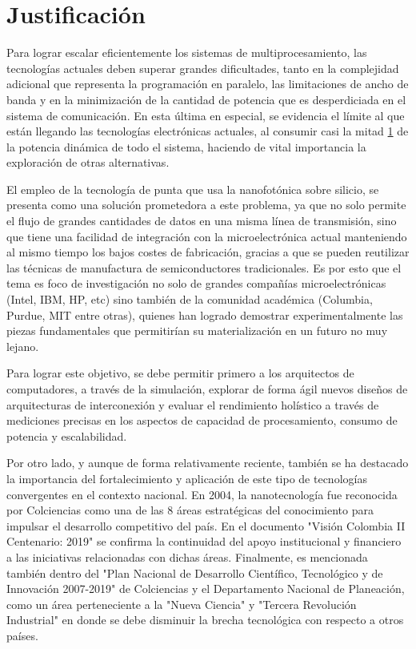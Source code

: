 \section{Justificación}
Para lograr escalar eficientemente los sistemas de multiprocesamiento, las tecnologías 
actuales deben superar grandes dificultades, tanto en la complejidad adicional 
que representa la programación en paralelo, las limitaciones de ancho de banda y en la
minimización de la cantidad de potencia que es desperdiciada en el sistema de comunicación. 
En esta última en especial, se evidencia el límite al que están llegando las 
tecnologías electrónicas actuales, al consumir casi la mitad \ref{} de la potencia dinámica
de todo el sistema, haciendo de vital importancia la exploración de otras alternativas.

El empleo de la tecnología de punta que usa la nanofotónica sobre silicio, 
se presenta como una solución prometedora a este
problema, ya que no solo permite el flujo de grandes cantidades de 
datos en una misma línea de transmisión, sino que tiene una facilidad de 
integración con la microelectrónica actual manteniendo al mismo tiempo los 
bajos costes de fabricación, gracias a que se pueden reutilizar las técnicas 
de manufactura de semiconductores tradicionales. Es por esto que el tema es foco de
investigación no solo de grandes compañías microelectrónicas (Intel, IBM, HP, etc) 
sino también de la comunidad académica (Columbia, Purdue, MIT entre otras), 
quienes han logrado demostrar experimentalmente las piezas fundamentales que 
permitirían su materialización en un futuro no muy lejano.

Para lograr este objetivo, se debe permitir primero a los arquitectos de computadores, 
a través de la simulación, explorar de forma ágil nuevos diseños de arquitecturas 
de interconexión y evaluar el rendimiento holístico a través de mediciones 
precisas en los aspectos de capacidad de procesamiento, consumo de potencia y escalabilidad.

Por otro lado, y aunque de forma relativamente reciente, también se ha destacado 
la importancia del fortalecimiento y aplicación de este tipo de tecnologías convergentes 
en el contexto nacional. En 2004, la nanotecnología fue reconocida por Colciencias como
una de las 8 áreas estratégicas del conocimiento para impulsar el desarrollo 
competitivo del país. En el documento "Visión Colombia II Centenario: 2019" 
se confirma la continuidad del apoyo institucional y financiero 
a las iniciativas relacionadas con dichas áreas. 
Finalmente, es mencionada también dentro del 
"Plan Nacional de Desarrollo Científico, Tecnológico y de Innovación 2007-2019" 
de Colciencias y el Departamento Nacional de Planeación, 
como un área perteneciente a la "Nueva Ciencia" y "Tercera Revolución Industrial" 
en donde se debe disminuir la brecha tecnológica con respecto a otros países.

